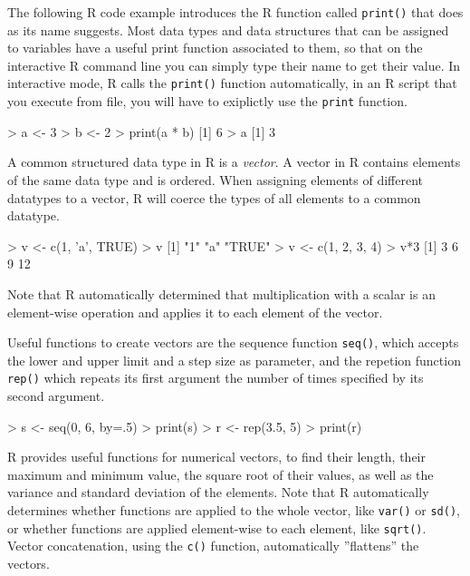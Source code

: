 The following R code example introduces the R function called \texttt{print()} that does as its name suggests. Most data types and data structures that can be assigned to variables have a useful print function associated to them, so that on the interactive R command line you can simply type their name to get their value. In interactive mode, R calls the \texttt{print()} function automatically, in an R script that you execute from file, you will have to exiplictly use the \texttt{print} function.

\begin{samepage}
\begin{Rcode}
> a <- 3
> b <- 2
> print(a * b)
[1] 6
> a
[1] 3
\end{Rcode}
\end{samepage}

A common structured data type in R is a \emph{vector}. A vector in R contains elements of the same data type and is ordered. When assigning elements of different datatypes to a vector, R will coerce the types of all elements to a common datatype.

\begin{samepage}
\begin{Rcode}
> v <- c(1, 'a', TRUE)
> v
[1] "1"    "a"    "TRUE"
> v <- c(1, 2, 3, 4)
> v*3
[1]  3  6  9 12
\end{Rcode}
\end{samepage}

Note that R automatically determined that multiplication with a scalar is an element-wise operation and applies it to each element of the vector. 

Useful functions to create vectors are the sequence function \texttt{seq()}, which accepts the lower and upper limit and a step size as parameter, and the repetion function \texttt{rep()} which repeats its first argument the number of times specified by its second argument.

\begin{samepage}
\begin{Rcode}
> s <- seq(0, 6, by=.5)
> print(s)
> r <- rep(3.5, 5)
> print(r)
\end{Rcode}
\end{samepage}

R provides useful functions for numerical vectors, to find their length, their maximum and minimum value, the square root of their values, as well as the variance and standard deviation of the elements. Note that R automatically determines whether functions are applied to the whole vector, like \texttt{var()} or \texttt{sd()}, or whether functions are applied element-wise to each element, like \texttt{sqrt()}. Vector concatenation, using the \texttt{c()} function, automatically ''flattens'' the vectors.

